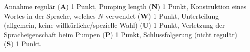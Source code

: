 \begin{bewertung}
Annahme regulär ({\bf A}) 1 Punkt,
Pumping length ({\bf N}) 1 Punkt,
Konstruktion eines Wortes in der Sprache, welches $N$ verwendet ({\bf W})
1 Punkt,
Unterteilung (allgemein, keine willkürliche/spezielle Wahl) ({\bf U}) 1 Punkt,
Verletzung der Spracheigenschaft beim Pumpen ({\bf P}) 1 Punkt,
Schluss\-folgerung (nicht regulär) ({\bf S}) 1 Punkt.
\end{bewertung}
 
